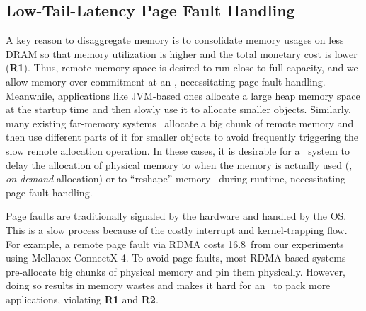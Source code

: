 \subsection{Low-Tail-Latency Page Fault Handling}

A key reason to disaggregate memory is to consolidate memory usages on less DRAM so that memory utilization is higher and the total monetary cost is lower (\textbf{R1}). Thus, remote memory space is desired to run close to full capacity, and we allow memory over-commitment at an \MN, necessitating page fault handling. Meanwhile, applications like JVM-based ones allocate a large heap memory space at the startup time and then slowly use it to allocate smaller objects. Similarly, many existing far-memory systems~\cite{Tsai20-ATC,AIFM,FaRM} allocate a big chunk of remote memory and then use different parts of it for smaller objects to avoid frequently triggering the slow remote allocation operation.
In these cases, it is desirable for a \md\ system to delay the allocation of physical memory to when the memory is actually used (\ie, {\em on-demand} allocation) or to ``reshape'' memory~\cite{cliquemap-sigcomm21} during runtime, necessitating page fault handling.

Page faults are traditionally signaled by the hardware and handled by the OS. %
This is a slow process because of the costly interrupt and kernel-trapping flow.
For example, a remote page fault via RDMA costs 16.8\ms\ from our experiments using Mellanox ConnectX-4.
To avoid page faults, most RDMA-based systems pre-allocate big chunks of physical memory and pin them physically.
However, doing so results in memory wastes and makes it hard for an \MN\ to pack more applications, violating \textbf{R1} and \textbf{R2}.


